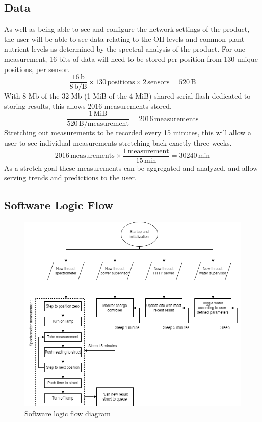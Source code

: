 \documentclass[journal]{IEEEtran}
\begin{document}
\subsection{Data}
As well as being able to see and configure the network settings of the product, the user will be able to see data relating to the OH-levels and common plant nutrient levels as determined by the spectral analysis of the product. For one measurement, 16 bits of data will need to be stored per position from 130 unique positions, per sensor.
\begin{equation}
	\frac{16\,\mathrm{b}}{8\,\mathrm{b/B}}\times 130\,\mathrm{positions} \times 2\,\mathrm{sensors} = 520\,\mathrm{B}
\end{equation}
With 8 Mb of the 32 Mb (1 MiB of the 4 MiB) shared serial flash dedicated to storing results, this allows 2016 measurements stored.
\begin{equation}
	\frac{1\,\mathrm{MiB}}{520\,\mathrm{B/measurement}} = 2016\,\mathrm{measurements}
\end{equation}
Stretching out measurements to be recorded every 15 minutes, this will allow a user to see individual measurements stretching back exactly three weeks.
\begin{equation}
	2016\,\mathrm{measurements} \times \frac{1\,\mathrm{measurement}}{15\,\mathrm{min}} = 30240\,\mathrm{min}
\end{equation}
As a stretch goal these measurements can be aggregated and analyzed, and allow serving trends and predictions to the user.

\subsection{Software Logic Flow} 
\begin{figure}[H]
    \centering
    \label{fig:logic-flow}
    \includegraphics[width=\linewidth]{images/logic-flow.png}
    \caption{Software logic flow diagram}
\end{figure}
\end{document}
